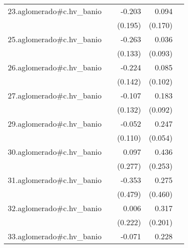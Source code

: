 {\begin{longtable}{l*{4}{D{.}{.}{-1}}}
\addlinespace
23.aglomerado#c.hv\_banio&                     &      -0.203         &       0.094         &                     \\
            &                     &     (0.195)         &     (0.170)         &                     \\
\addlinespace
25.aglomerado#c.hv\_banio&                     &      -0.263\sym{*}  &       0.036         &                     \\
            &                     &     (0.133)         &     (0.093)         &                     \\
\addlinespace
26.aglomerado#c.hv\_banio&                     &      -0.224         &       0.085         &                     \\
            &                     &     (0.142)         &     (0.102)         &                     \\
\addlinespace
27.aglomerado#c.hv\_banio&                     &      -0.107         &       0.183\sym{*}  &                     \\
            &                     &     (0.132)         &     (0.092)         &                     \\
\addlinespace
29.aglomerado#c.hv\_banio&                     &      -0.052         &       0.247\sym{***}&                     \\
            &                     &     (0.110)         &     (0.054)         &                     \\
\addlinespace
30.aglomerado#c.hv\_banio&                     &       0.097         &       0.436         &                     \\
            &                     &     (0.277)         &     (0.253)         &                     \\
\addlinespace
31.aglomerado#c.hv\_banio&                     &      -0.353         &       0.275         &                     \\
            &                     &     (0.479)         &     (0.460)         &                     \\
\addlinespace
32.aglomerado#c.hv\_banio&                     &       0.006         &       0.317         &                     \\
            &                     &     (0.222)         &     (0.201)         &                     \\
\addlinespace
33.aglomerado#c.hv\_banio&                     &      -0.071         &       0.228\sym{***}&                     \\

\end{longtable}}
